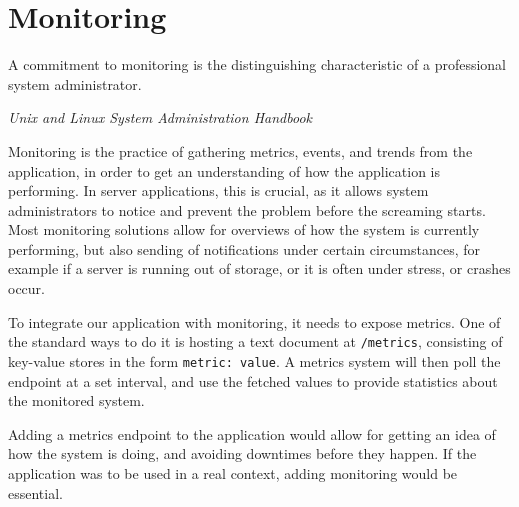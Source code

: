 \section{Monitoring}
\epigraph{A commitment to monitoring is the distinguishing characteristic of a professional system administrator.}{\textit{Unix and Linux System Administration Handbook\cite{sysadmin}}}

Monitoring is the practice of gathering metrics, events, and trends from the application, in order to get an understanding of how the application is performing.
In server applications, this is crucial, as it allows system administrators to notice and prevent the problem before the screaming starts.
Most monitoring solutions allow for overviews of how the system is currently performing, but also sending of notifications under certain circumstances, for example if a server is running out of storage, or it is often under stress, or crashes occur.\cite{sysadmin}

To integrate our application with monitoring, it needs to expose metrics.
One of the standard ways to do it is hosting a text document at \texttt{/metrics}, consisting of key-value stores in the form \texttt{metric: value}.
A metrics system will then poll the endpoint at a set interval, and use the fetched values to provide statistics about the monitored system.

Adding a metrics endpoint to the application would allow for getting an idea of how the system is doing, and avoiding downtimes before they happen. If the application was to be used in a real context, adding monitoring would be essential.
